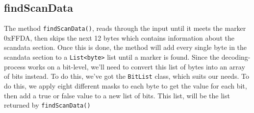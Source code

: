 \subsection{findScanData}
The method \lstinline|findScanData()|, reads through the input until it meets the marker 0xFFDA, then skips the next 12 bytes which contains information about the scandata section.
Once this is done, the method will add every single byte in the scandata section to a \lstinline|List<byte>| list until a marker is found.
Since the decoding-process works on a bit-level, we'll need to convert this list of bytes into an array of bits instead. To do this, we've got the \lstinline|BitList| class, which suits our needs.
To do this, we apply eight different masks to each byte to get the value for each bit, then add a true or false value to a new list of bits. 
This list, will be the list returned by \lstinline|findScanData()|

